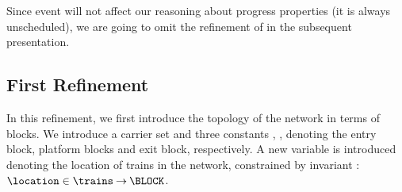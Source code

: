 Since event \arrive will not affect our reasoning about progress
properties (it is always unscheduled), we are going to omit the
refinement of \arrive in the subsequent presentation.

\subsection{First Refinement}
\label{sec:first-refinement}


In this refinement, we first introduce the topology of the network
in terms of blocks.  We introduce a carrier set \BLOCK and three
constants \Entry, \PLATFORM, \Exit denoting the entry block, platform
blocks and exit block, respectively.
A new variable \location is introduced denoting the location of trains
in the network, constrained by invariant \invLocationType: $\location
\in \trains \tfun \BLOCK$.

